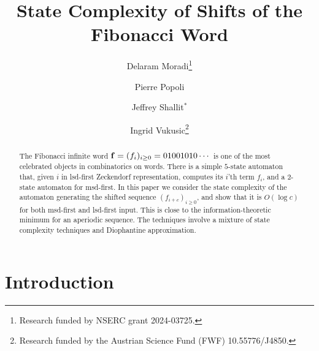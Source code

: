 \documentclass[12pt,runningheads]{llncs}
\begin{document}
\title{State Complexity of Shifts of the Fibonacci Word}

\author{Delaram Moradi\thanks{Research funded by NSERC grant 2024-03725.}\and
Pierre Popoli
\and Jeffrey Shallit$^{*}$
\and
Ingrid Vukusic\thanks{Research funded by the Austrian Science Fund (FWF) 10.55776/J4850.}}



\maketitle

\begin{abstract}
The Fibonacci infinite word ${\bf f} = (f_i)_{i \geq 0} = 01001010\cdots$ is one of the most celebrated objects in combinatorics on words. There is a simple $5$-state automaton that, given $i$ in lsd-first Zeckendorf representation, computes its $i$'th term $f_i$, and a $2$-state automaton for msd-first. In this paper we consider the state complexity of the automaton generating the shifted sequence $(f_{i+c})_{i \geq 0}$, and show that it is $O(\log c)$ for both msd-first and lsd-first input.  This is close to the information-theoretic minimum for an aperiodic sequence. The techniques involve a mixture of state complexity techniques and Diophantine approximation. 
\end{abstract}

\section{Introduction}\label{sec:intro}
\end{document}

